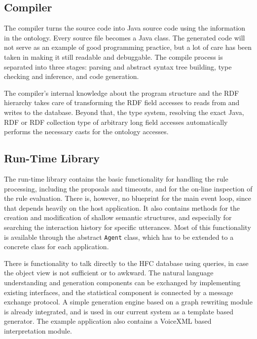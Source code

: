 \subsection{Compiler}
\label{sec:compiler}

The compiler turns the \vonda source code into Java source code using the information
in the ontology. Every source file becomes a Java class. The generated code
will not serve as an example of good programming practice, but a lot of care
has been taken in making it still readable and debuggable. The
compile process is separated into three stages: parsing and abstract syntax tree building,
type checking and inference, and code generation.

The \vonda compiler's internal knowledge about the program structure and the
RDF hierarchy takes care of transforming the RDF field accesses to reads from and
writes to the database. Beyond that, the type system, resolving the exact
Java, RDF or RDF collection type of arbitrary long field accesses automatically
performs the necessary casts for the ontology accesses.

\subsection{Run-Time Library}

The run-time library contains the basic functionality for handling the rule
processing, including the proposals and timeouts, and for the on-line
inspection of the rule evaluation. There is, however, no blueprint for the main
event loop, since that depends heavily on the host application. It also
contains methods for the creation and modification of shallow semantic
structures, and especially for searching the interaction history for specific
utterances. Most of this functionality is available through the abstract
\texttt{Agent} class, which has to be extended to a concrete class for each
application.

There is functionality to talk directly to the HFC database using queries, in
case the object view is not sufficient or to awkward. The natural language
understanding and generation components can be exchanged by implementing existing
interfaces, and the statistical component is connected by a message exchange
protocol. A simple generation engine based on a graph rewriting module is
already integrated, and is used in our current system as a template based
generator. The example application also contains a VoiceXML based
interpretation module.

